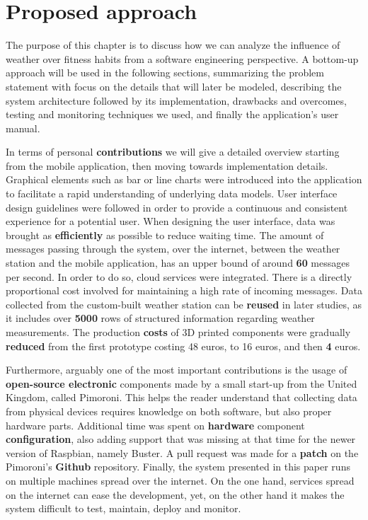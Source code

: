 \chapter{Proposed approach}
\pagestyle{fancy}
\label{solution}

The purpose of this chapter is to discuss how we can analyze the influence of weather over fitness habits from a software engineering perspective. A bottom-up approach will be used in the following sections, summarizing the problem statement with focus on the details that will later be modeled, describing the system architecture followed by its implementation, drawbacks and overcomes, testing and monitoring techniques we used, and finally the application's user manual. 

In terms of personal \textbf{contributions} we will give a detailed overview starting from the mobile application, then moving towards implementation details. Graphical elements such as bar or line charts were introduced into the application to facilitate a rapid understanding of underlying data models. User interface design guidelines were followed in order to provide a continuous and consistent experience for a potential user. When designing the user interface, data was brought as \textbf{efficiently} as possible to reduce waiting time. The amount of messages passing through the system, over the internet, between the weather station and the mobile application, has an upper bound of around \textbf{60} messages per second. In order to do so, cloud services were integrated. There is a directly proportional cost involved for maintaining a high rate of incoming messages. Data collected from the custom-built weather station can be \textbf{reused} in later studies, as it includes over \textbf{5000} rows of structured information regarding weather measurements. The production \textbf{costs} of 3D printed components were gradually \textbf{reduced} from the first prototype costing 48 euros, to 16 euros, and then \textbf{4} euros. 

Furthermore, arguably one of the most important contributions is the usage of \textbf{open-source electronic} components made by a small start-up from the United Kingdom, called Pimoroni. This helps the reader understand that collecting data from physical devices requires knowledge on both software, but also proper hardware parts. Additional time was spent on \textbf{hardware} component \textbf{configuration}, also adding support that was missing at that time for the newer version of Raspbian, namely Buster. A pull request was made for a \textbf{patch} on the Pimoroni's \textbf{Github} repository. Finally, the system presented in this paper runs on multiple machines spread over the internet. On the one hand, services spread on the internet can ease the development, yet, on the other hand it makes the system difficult to test, maintain, deploy and monitor.

